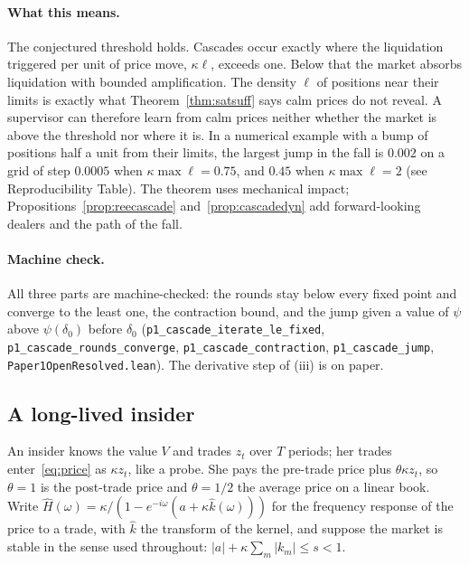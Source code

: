 \documentclass[12pt]{article}
\theoremstyle{definition}
\theoremstyle{remark}
\begin{document}
\paragraph{What this means.} The conjectured threshold holds. Cascades occur exactly where the liquidation triggered per unit of price move, $\kappa\ell$, exceeds one. Below that the market absorbs liquidation with bounded amplification. The density $\ell$ of positions near their limits is exactly what Theorem~\ref{thm:satsuff} says calm prices do not reveal. A supervisor can therefore learn from calm prices neither whether the market is above the threshold nor where it is. In a numerical example with a bump of positions half a unit from their limits, the largest jump in the fall is $0.002$ on a grid of step $0.0005$ when $\kappa\max\ell=0.75$, and $0.45$ when $\kappa\max\ell=2$ (see Reproducibility Table). The theorem uses mechanical impact; Propositions~\ref{prop:reecascade} and~\ref{prop:cascadedyn} add forward-looking dealers and the path of the fall.

\paragraph{Machine check.} All three parts are machine-checked: the rounds stay below every fixed point and converge to the least one, the contraction bound, and the jump given a value of $\psi$ above $\psi(\delta_0)$ before $\delta_0$ (\texttt{p1\_cascade\_iterate\_le\_fixed}, \texttt{p1\_cascade\_rounds\_converge}, \texttt{p1\_cascade\_contraction}, \texttt{p1\_cascade\_jump}, \nolinkurl{Paper1OpenResolved.lean}). The derivative step of (iii) is on paper.

\subsection{A long-lived insider}

An insider knows the value $V$ and trades $z_t$ over $T$ periods; her trades enter~\eqref{eq:price} as $\kappa z_t$, like a probe. She pays the pre-trade price plus $\theta\kappa z_t$, so $\theta=1$ is the post-trade price and $\theta=1/2$ the average price on a linear book. Write $\hat H(\omega)=\kappa/(1-e^{-i\omega}(a+\kappa\hat k(\omega)))$ for the frequency response of the price to a trade, with $\hat k$ the transform of the kernel, and suppose the market is stable in the sense used throughout: $|a|+\kappa\sum_m|k_m|\le s<1$.
\end{document}
